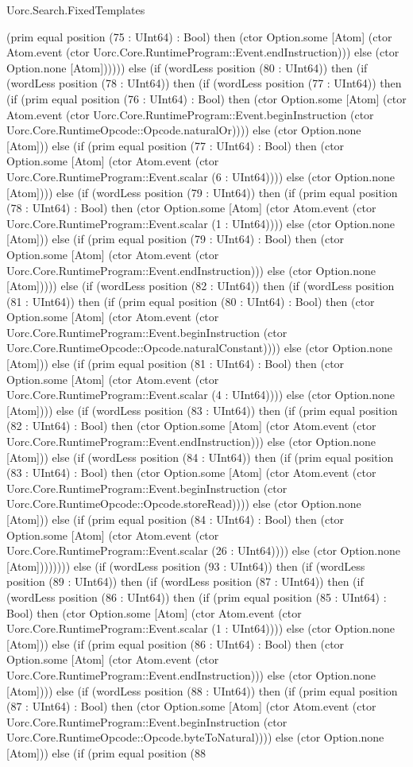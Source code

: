 \begin{lexlean}{Uorc.Search.FixedTemplates}
\begin{semanticmodule}
{(prim equal position (75 : UInt64) : Bool) then (ctor Option.some [Atom] (ctor Atom.event (ctor Uorc.Core.RuntimeProgram::Event.endInstruction))) else (ctor Option.none [Atom]))))) else (if (wordLess position (80 : UInt64)) then (if (wordLess position (78 : UInt64)) then (if (wordLess position (77 : UInt64)) then (if (prim equal position (76 : UInt64) : Bool) then (ctor Option.some [Atom] (ctor Atom.event (ctor Uorc.Core.RuntimeProgram::Event.beginInstruction (ctor Uorc.Core.RuntimeOpcode::Opcode.naturalOr)))) else (ctor Option.none [Atom])) else (if (prim equal position (77 : UInt64) : Bool) then (ctor Option.some [Atom] (ctor Atom.event (ctor Uorc.Core.RuntimeProgram::Event.scalar (6 : UInt64)))) else (ctor Option.none [Atom]))) else (if (wordLess position (79 : UInt64)) then (if (prim equal position (78 : UInt64) : Bool) then (ctor Option.some [Atom] (ctor Atom.event (ctor Uorc.Core.RuntimeProgram::Event.scalar (1 : UInt64)))) else (ctor Option.none [Atom])) else (if (prim equal position (79 : UInt64) : Bool) then (ctor Option.some [Atom] (ctor Atom.event (ctor Uorc.Core.RuntimeProgram::Event.endInstruction))) else (ctor Option.none [Atom])))) else (if (wordLess position (82 : UInt64)) then (if (wordLess position (81 : UInt64)) then (if (prim equal position (80 : UInt64) : Bool) then (ctor Option.some [Atom] (ctor Atom.event (ctor Uorc.Core.RuntimeProgram::Event.beginInstruction (ctor Uorc.Core.RuntimeOpcode::Opcode.naturalConstant)))) else (ctor Option.none [Atom])) else (if (prim equal position (81 : UInt64) : Bool) then (ctor Option.some [Atom] (ctor Atom.event (ctor Uorc.Core.RuntimeProgram::Event.scalar (4 : UInt64)))) else (ctor Option.none [Atom]))) else (if (wordLess position (83 : UInt64)) then (if (prim equal position (82 : UInt64) : Bool) then (ctor Option.some [Atom] (ctor Atom.event (ctor Uorc.Core.RuntimeProgram::Event.endInstruction))) else (ctor Option.none [Atom])) else (if (wordLess position (84 : UInt64)) then (if (prim equal position (83 : UInt64) : Bool) then (ctor Option.some [Atom] (ctor Atom.event (ctor Uorc.Core.RuntimeProgram::Event.beginInstruction (ctor Uorc.Core.RuntimeOpcode::Opcode.storeRead)))) else (ctor Option.none [Atom])) else (if (prim equal position (84 : UInt64) : Bool) then (ctor Option.some [Atom] (ctor Atom.event (ctor Uorc.Core.RuntimeProgram::Event.scalar (26 : UInt64)))) else (ctor Option.none [Atom]))))))) else (if (wordLess position (93 : UInt64)) then (if (wordLess position (89 : UInt64)) then (if (wordLess position (87 : UInt64)) then (if (wordLess position (86 : UInt64)) then (if (prim equal position (85 : UInt64) : Bool) then (ctor Option.some [Atom] (ctor Atom.event (ctor Uorc.Core.RuntimeProgram::Event.scalar (1 : UInt64)))) else (ctor Option.none [Atom])) else (if (prim equal position (86 : UInt64) : Bool) then (ctor Option.some [Atom] (ctor Atom.event (ctor Uorc.Core.RuntimeProgram::Event.endInstruction))) else (ctor Option.none [Atom]))) else (if (wordLess position (88 : UInt64)) then (if (prim equal position (87 : UInt64) : Bool) then (ctor Option.some [Atom] (ctor Atom.event (ctor Uorc.Core.RuntimeProgram::Event.beginInstruction (ctor Uorc.Core.RuntimeOpcode::Opcode.byteToNatural)))) else (ctor Option.none [Atom])) else (if (prim equal position (88 }
\end{semanticmodule}
\end{lexlean}
